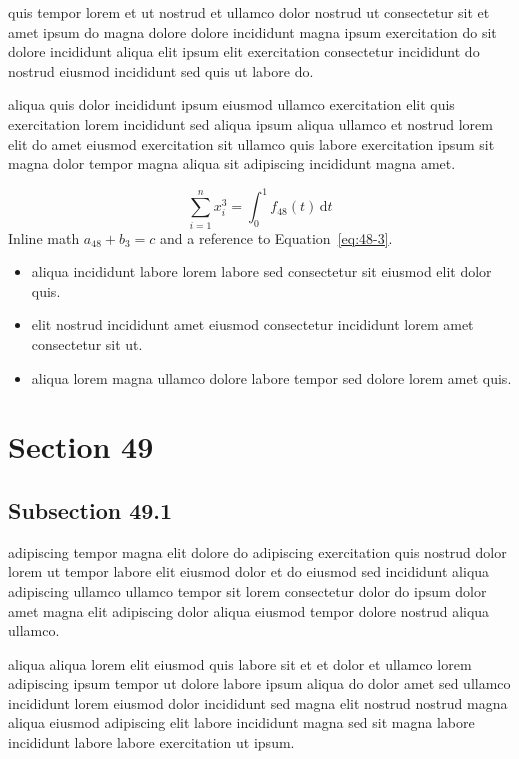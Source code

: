 \documentclass{article}
\begin{document}
quis tempor lorem et ut nostrud et ullamco dolor nostrud ut consectetur sit et amet ipsum do magna dolore dolore incididunt magna ipsum exercitation do sit dolore incididunt aliqua elit ipsum elit exercitation consectetur incididunt do nostrud eiusmod incididunt sed quis ut labore do.

aliqua quis dolor incididunt ipsum eiusmod ullamco exercitation elit quis exercitation lorem incididunt sed aliqua ipsum aliqua ullamco et nostrud lorem elit do amet eiusmod exercitation sit ullamco quis labore exercitation ipsum sit magna dolor tempor magna aliqua sit adipiscing incididunt magna amet.

\begin{equation}\label{eq:48-3}
  \sum_{i=1}^{n} x_i^{3} = \int_0^1 f_{48}(t)\,\mathrm{d}t
\end{equation}
Inline math $a_{48} + b_{3} = c$ and a reference to Equation~\eqref{eq:48-3}.

\begin{itemize}
  \item aliqua incididunt labore lorem labore sed consectetur sit eiusmod elit dolor quis.
  \item elit nostrud incididunt amet eiusmod consectetur incididunt lorem amet consectetur sit ut.
  \item aliqua lorem magna ullamco dolore labore tempor sed dolore lorem amet quis.
\end{itemize}

\section{Section 49}\label{sec:49}
\subsection{Subsection 49.1}\label{sec:49-1}
adipiscing tempor magna elit dolore do adipiscing exercitation quis nostrud dolor lorem ut tempor labore elit eiusmod dolor et do eiusmod sed incididunt aliqua adipiscing ullamco ullamco tempor sit lorem consectetur dolor do ipsum dolor amet magna elit adipiscing dolor aliqua eiusmod tempor dolore nostrud aliqua ullamco.

aliqua aliqua lorem elit eiusmod quis labore sit et et dolor et ullamco lorem adipiscing ipsum tempor ut dolore labore ipsum aliqua do dolor amet sed ullamco incididunt lorem eiusmod dolor incididunt sed magna elit nostrud nostrud magna aliqua eiusmod adipiscing elit labore incididunt magna sed sit magna labore incididunt labore labore exercitation ut ipsum.
\end{document}
